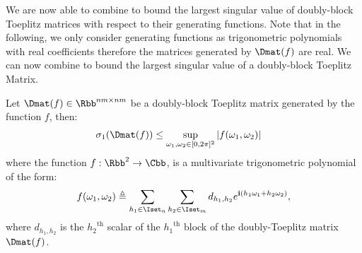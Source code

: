 We are now able to combine  to bound the largest singular value of doubly-block Toeplitz matrices with respect to their generating functions. 
Note that in the following, we only consider generating functions as trigonometric polynomials with real coefficients therefore the matrices generated by $\Dmat(f)$ are real. We can now combine  to bound the largest singular value of a doubly-block Toeplitz Matrix. 

\begin{maintheorem} \label{theorem:doubly_block_teoplitz_sup_singular}
  Let $\Dmat(f) \in \Rbb^{nm \times nm}$ be a doubly-block Toeplitz matrix generated by the function $f$, then:
  \begin{align}
    \sigma_{1} \left( \Dmat(f) \right) &\leq \sup_{\omega_1, \omega_2 \in [0, 2\pi]^2}|f(\omega_1,\omega_2)|
  \end{align}
  where the function $f: \Rbb^2 \rightarrow \Cbb$, is a multivariate trigonometric polynomial of the form:
  \begin{equation}\label{equation:muli_variate_poly_on_M}
    f(\omega_1, \omega_2) \triangleq \sum_{h_1 \in \Iset_n} \sum_{h_2 \in \Iset_m} d_{h_1, h_2} e^{\ci (h_1 \omega_1 + h_2 \omega_2)},
  \end{equation}
  where $d_{h_{1},h_{2}}$ is the ${h_2}^\textrm{th}$ scalar of the ${h_1}^\textrm{th}$ block of the doubly-Toeplitz matrix $\Dmat(f)$.
\end{maintheorem}


